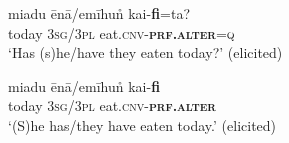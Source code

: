 \documentclass[output=paper]{langsci/langscibook}
\begin{document}
\begin{exe}
	\ex 	\label{ex:jl5}
	\gll miadu ēnā/emīhun̊ kai-\textbf{fi}=ta?\\
	today \textsc{3sg}/\textsc{3pl} eat.\textsc{cnv}-\textbf{\textsc{prf}.\textsc{alter}}=\textsc{q}\\
	\trans ‘Has (s)he/have they eaten today?’ (elicited)
\end{exe}

\begin{exe}
	\ex 	\label{ex:jl6}
	\gll miadu ēnā/emīhun̊ kai-\textbf{fi}\\
	today \textsc{3sg}/\textsc{3pl} eat.\textsc{cnv}-\textbf{\textsc{prf}.\textsc{alter}}\\
	\trans ‘(S)he has/they have eaten today.’ (elicited)
\end{exe}
\end{document}
